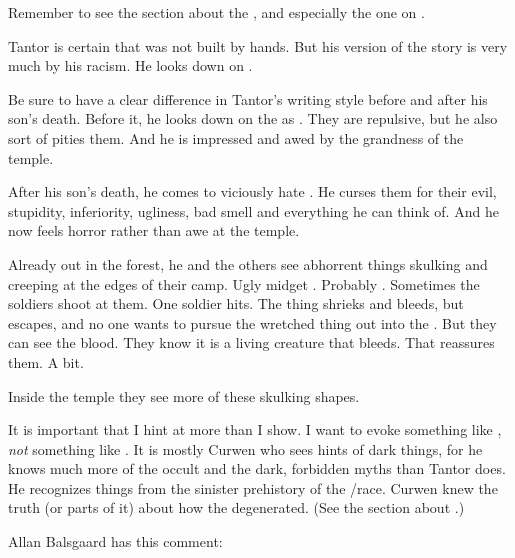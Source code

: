 \begin{changes}
    Remember to see the section about the , and especially the one on . 
    
    Tantor is certain that \EreshKal was not built by \meccaran hands. 
    But his version of the story is very much \coloured by his racism. 
    He looks down on \meccara. 
    
    Be sure to have a clear difference in Tantor's writing style before and after his son's death. 
    Before it, he looks down on the \meccara as . 
    They are repulsive, but he also sort of pities them. 
    And he is impressed and awed by the grandness of the temple. 
    
    After his son's death, he comes to viciously hate \meccara. 
    He curses them for their evil, stupidity, inferiority, ugliness, bad smell and everything he can think of. 
    And he now feels horror rather than awe at the temple. 
    
    Already out in the forest, he and the others see abhorrent things skulking and creeping at the edges of their camp. 
    Ugly midget \humanoids. 
    Probably \meccara. 
    Sometimes the soldiers shoot at them. 
    One soldier hits. 
    The thing shrieks and bleeds, but escapes, and no one wants to pursue the wretched thing out into the \wylde. 
    But they can see the blood. 
    They know it is a living creature that bleeds. 
    That reassures them. 
    A bit. 
    
    Inside the temple they see more of these skulking shapes.
    
    It is important that I hint at more than I show. 
    I want to evoke something like \cite{HPLovecraft:AttheMountainsofMadness}, \emph{not} something like \cite{JohnGlasby:TheBroodingCity}. 
    It is mostly Curwen who sees hints of dark things, for he knows much more of the occult and the dark, forbidden myths than Tantor does.
    He recognizes things from the sinister prehistory of the \scatha/\meccaran race.
    Curwen knew the truth (or parts of it) about how the \meccara degenerated. 
    (See the section about .)
    
    Allan Balsgaard has this comment:
    

\end{changes}
